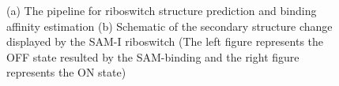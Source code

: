 \documentclass[a4paper,10pt]{article}
\newcommand{\up}{\vspace*{-1em}}
\begin{document}
\begin{figure}
\begin{center}
\end{center}
\up\up
\caption{(a) The pipeline for riboswitch structure prediction and binding affinity estimation (b) Schematic of the secondary structure change displayed by the SAM-I riboswitch (The left figure represents the OFF state resulted by the SAM-binding and the right figure represents the ON state)}
\label{fig:ribo-pipeline}
\up
\end{figure}
\end{document}
